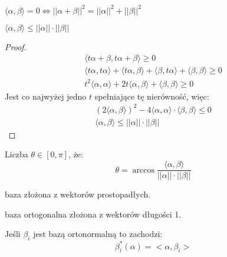 \begin{corollary}[Pitagoras]
    $  \langle  \alpha, \beta \rangle = 0 \iff || \alpha + \beta ||^2 = || \alpha ||^2 + || \beta ||^2 $
\end{corollary}

\begin{corollary}[Schwarz]
    $ \langle \alpha, \beta \rangle \leq ||\alpha|| \cdot || \beta || $
\end{corollary}

\begin{proof}
    \begin{align*}
        \langle t \alpha + \beta, t \alpha + \beta \rangle \geq 0 \\
        \langle t \alpha, t \alpha \rangle + \langle t \alpha, \beta \rangle + \langle \beta, t \alpha \rangle + \langle  \beta, \beta \rangle \geq 0 \\
        t^2\langle \alpha, \alpha \rangle + 2t\langle \alpha, \beta \rangle + \langle  \beta, \beta \rangle \geq 0
    \end{align*}
    Jest co najwyżej jedno $t$ spełniające tę nierówność, więc:
    \begin{align*}
        (2\langle \alpha, \beta \rangle)^2 - 4 \langle \alpha, \alpha \rangle \cdot \langle  \beta, \beta \rangle \leq 0 \\
        \langle \alpha, \beta \rangle \leq ||\alpha|| \cdot || \beta ||
    \end{align*}
\end{proof}

\begin{definition}[kąt] Liczba $\theta \in [0, \pi]$, że:
    \[ \theta  = \arccos \frac{\langle \alpha , \beta \rangle }{||\alpha|| \cdot || \beta ||} \]
\end{definition}

\begin{definition} baza złożona z wektorów prostopadłych.\end{definition}
\begin{definition} baza ortogonalna złożona z wektorów długości 1. \end{definition}
\begin{statement}
    Jeśli $\beta_i$ jest bazą ortonormalną to zachodzi: \[\beta_i^*(\alpha) = <\alpha, \beta_i>\]
\end{statement}